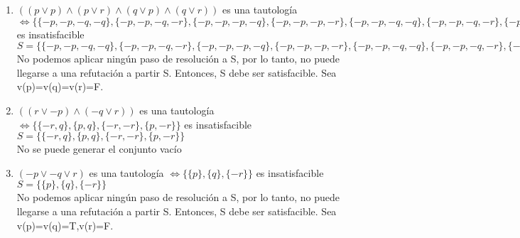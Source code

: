 \documentclass[10pt,a4paper]{article}
\begin{document}
\begin{enumerate}
        $S=\{\{-q, -p\},\{-q, p\},\{-q, q\},\{p, -p\},\{p, p\},\{p, q\},\{q, -p\},\{q, p\},\{q, q\}\}$ \\
        $\{-q, -p\}-(-q, -p) \cup \{p, q\}-(p, q)=\{\}$ \\
        $S=\{\{-q, -p\},\{-q, p\},\{-q, q\},\{p, -p\},\{p, p\},\{p, q\},\{q, -p\},\{q, p\},\{q, q\},\{\}\} \Rightarrow $ es insatisfacible
        \item $((p \vee p)\wedge(p \vee r)\wedge(q \vee p)\wedge(q \vee r))$ es una tautología $ \Leftrightarrow \{\{-p, -p, -q, -q\},\{-p, -p, -q, -r\},\{-p, -p, -p, -q\},\{-p, -p, -p, -r\},\{-p, -p, -q, -q\},\{-p, -p, -q, -r\},\{-p, -p, -p, -q\},\{-p, -p, -p, -r\},\{-p, -r, -q, -q\},\{-p, -r, -q, -r\},\{-p, -r, -p, -q\},\{-p, -r, -p, -r\},\{-p, -r, -q, -q\},\{-p, -r, -q, -r\},\{-p, -r, -p, -q\},\{-p, -r, -p, -r\}\} $ es insatisfacible \\
        $S=\{\{-p, -p, -q, -q\},\{-p, -p, -q, -r\},\{-p, -p, -p, -q\},\{-p, -p, -p, -r\},\{-p, -p, -q, -q\},\{-p, -p, -q, -r\},\{-p, -p, -p, -q\},\{-p, -p, -p, -r\},\{-p, -r, -q, -q\},\{-p, -r, -q, -r\},\{-p, -r, -p, -q\},\{-p, -r, -p, -r\},\{-p, -r, -q, -q\},\{-p, -r, -q, -r\},\{-p, -r, -p, -q\},\{-p, -r, -p, -r\}\}$ \\
        No podemos aplicar ningún paso de resolución a S, por lo tanto, no puede llegarse a una refutación a partir S. Entonces, S debe ser satisfacible. Sea v(p)=v(q)=v(r)=F.
        \item $((r \vee -p)\wedge(-q \vee r))$ es una tautología $ \Leftrightarrow \{\{-r, q\},\{p, q\},\{-r, -r\},\{p, -r\}\} $ es insatisfacible \\
        $S=\{\{-r, q\},\{p, q\},\{-r, -r\},\{p, -r\}\}$ \\
        No se puede generar el conjunto vacío
        \item $(-p \vee -q \vee r)$ es una tautología $ \Leftrightarrow \{\{p\},\{q\},\{-r\}\} $ es insatisfacible \\
        $S=\{\{p\},\{q\},\{-r\}\}$ \\
        No podemos aplicar ningún paso de resolución a S, por lo tanto, no puede llegarse a una refutación a partir S. Entonces, S debe ser satisfacible. Sea v(p)=v(q)=T,v(r)=F.
    \end{enumerate}
\end{document}
